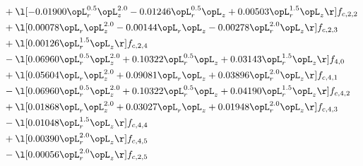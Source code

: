 \begin{alignat}{2}
& + \l[  -0.01900 \opL_r^{0.5} \opL_z^{2.0}   -0.01246 \opL_r^{0.5} \opL_z +  0.00503 \opL_r^{1.5} \opL_z  \r] f_{c,2,2} \nonumber \\ 
& + \l[  0.00078 \opL_r \opL_z^{2.0}   -0.00144 \opL_r \opL_z   -0.00278 \opL_r^{2.0} \opL_z  \r] f_{c,2,3} \nonumber \\ 
& + \l[  0.00126 \opL_r^{1.5} \opL_z  \r] f_{c,2,4} \nonumber \\ 
& - \l[  0.06960 \opL_r^{0.5} \opL_z^{2.0} +  0.10322 \opL_r^{0.5} \opL_z +  0.03143 \opL_r^{1.5} \opL_z  \r] f_{4,0} \nonumber \\ 
& + \l[  0.05604 \opL_r \opL_z^{2.0} +  0.09081 \opL_r \opL_z +  0.03896 \opL_r^{2.0} \opL_z  \r] f_{c,4,1} \nonumber \\ 
& - \l[  0.06960 \opL_r^{0.5} \opL_z^{2.0} +  0.10322 \opL_r^{0.5} \opL_z +  0.04190 \opL_r^{1.5} \opL_z  \r] f_{c,4,2} \nonumber \\ 
& + \l[  0.01868 \opL_r \opL_z^{2.0} +  0.03027 \opL_r \opL_z +  0.01948 \opL_r^{2.0} \opL_z  \r] f_{c,4,3} \nonumber \\ 
& - \l[  0.01048 \opL_r^{1.5} \opL_z  \r] f_{c,4,4} \nonumber \\ 
& + \l[  0.00390 \opL_r^{2.0} \opL_z  \r] f_{c,4,5} \nonumber \\ 
& - \l[  0.00056 \opL_r^{2.0} \opL_z  \r] f_{c,2,5} \nonumber \\ 
\end{alignat} 


